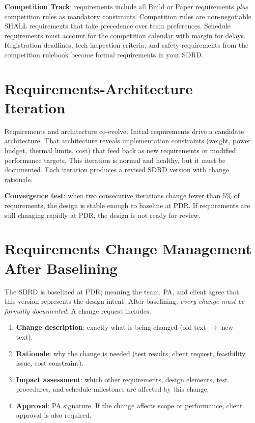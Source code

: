 \textbf{Competition Track}: requirements include all Build or Paper requirements \emph{plus} competition rules as mandatory constraints. Competition rules are non-negotiable SHALL requirements that take precedence over team preferences. Schedule requirements must account for the competition calendar with margin for delays. Registration deadlines, tech inspection criteria, and safety requirements from the competition rulebook become formal requirements in your SDRD.

\section{Requirements-Architecture Iteration}
Requirements and architecture co-evolve. Initial requirements drive a candidate architecture. That architecture reveals implementation constraints (weight, power budget, thermal limits, cost) that feed back as new requirements or modified performance targets. This iteration is normal and healthy, but it must be documented. Each iteration produces a revised SDRD version with change rationale.

\textbf{Convergence test}: when two consecutive iterations change fewer than 5\% of requirements, the design is stable enough to baseline at PDR. If requirements are still changing rapidly at PDR, the design is not ready for review.

\section{Requirements Change Management After Baselining}
The SDRD is baselined at PDR; meaning the team, PA, and client agree that this version represents the design intent. After baselining, \emph{every change must be formally documented}. A change request includes:

\begin{enumerate}[nosep,leftmargin=1.5em]
\item \textbf{Change description}: exactly what is being changed (old text $\to$ new text).
\item \textbf{Rationale}: why the change is needed (test results, client request, feasibility issue, cost constraint).
\item \textbf{Impact assessment}: which other requirements, design elements, test procedures, and schedule milestones are affected by this change.
\item \textbf{Approval}: PA signature. If the change affects scope or performance, client approval is also required.
\end{enumerate}

